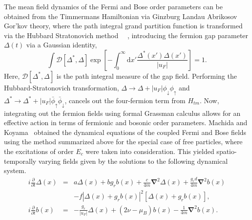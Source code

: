 \documentclass[aps,pra,floats,epsfig,pdflatex]{revtex4}                                                              %
\begin{document}
 {The mean field dynamics of the Fermi and Bose order parameters can be obtained from the Timmermans Hamiltonian via Ginzburg Landau Abrikosov Gor'kov theory, where the path integral grand partition function is transformed via the Hubbard Stratonovich method}\ ~\cite{hubbard:hstrans,coleman} {, introducing the fermion gap parameter $\Delta(t)$ via a Gaussian identity,}
\begin{equation}
\int {\mathcal D}[\Delta^*,\Delta] \exp{\left[-\int^\infty_0{{\mathrm d}x'}\frac{\Delta^*(x')\Delta(x')}{|u_F|}\right]}=1.
\end{equation}
 {Here, $ {\mathcal D}[\Delta^*,\Delta]$ is the path integral measure of the gap field. Performing the Hubbard-Stratonovich transformation, $\Delta\rightarrow \Delta + |u_F|\phi_\downarrow\phi_\uparrow $ and $\Delta^*\rightarrow \Delta^* + |u_F|\bar{\phi}_\uparrow\bar{\phi}_\downarrow$, cancels out the four-fermion term from $H_{tm}$. Now, integrating out the fermion fields using formal Grassman calculus allows for an effective action in terms of fermionic and bosonic order parameters. Machida and Koyama}~\cite{machida:dynamics}  {obtained the dynamical equations of the coupled Fermi and Bose fields using the method summarized above for the special case of free particles, where the excitations of order $E_c$ were taken into consideration. This yielded spatio-temporally varying fields given by the solutions to the following dynamical system.} 
\begin{eqnarray}
\label{timmermans:fulldyn}
i \frac{\partial}{\partial t}\Delta(x) &=&  a\Delta(x) + b g_r b(x)+ \frac{c}{4m}{\boldsymbol \nabla}^2\Delta(x)+\frac{g_r d}{4m}{\boldsymbol \nabla}^2b(x)\nonumber \\
                                       & & -f|\Delta(x)+g_r b(x)|^2 \left[\Delta(x)+g_r b(x)\right], \nonumber \\
i \frac{\partial}{\partial t}b(x) &=& -\frac{g_r}{|u_F|}\Delta(x)+\left(2\nu-\mu_B\right)b(x)-\frac{1}{4m}{\boldsymbol \nabla}^2 b(x).
\end{eqnarray}
\end{document}

